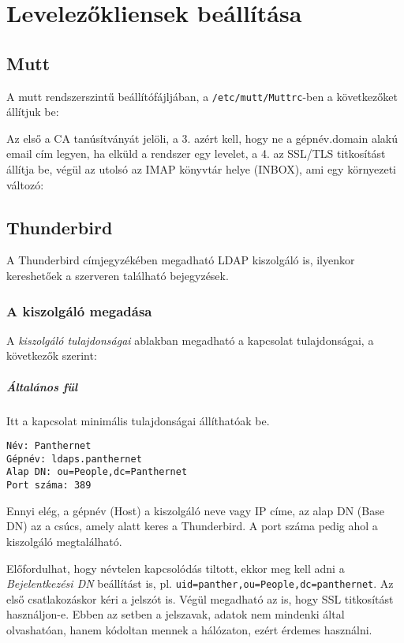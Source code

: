 \chapter{Levelezőkliensek beállítása}
\section{Mutt}
A mutt rendszerszintű beállítófájljában, a \texttt{/etc/mutt/Muttrc}-ben a következőket állítjuk be:


Az első a CA tanúsítványát jelöli, a 3. azért kell, hogy ne a gépnév.domain alakú email cím legyen, ha elküld a
rendszer egy levelet, a 4. az SSL/TLS titkosítást állítja be, végül az utolsó az IMAP könyvtár helye (INBOX), ami egy
környezeti változó:


\section{Thunderbird}
A Thunderbird címjegyzékében megadható LDAP kiszolgáló is, ilyenkor kereshetőek a szerveren található bejegyzések.

\subsection{A kiszolgáló megadása}
A \emph{kiszolgáló tulajdonságai} ablakban megadható a kapcsolat tulajdonságai, a következők szerint:

\paragraph{Általános fül} Itt a kapcsolat minimális tulajdonságai állíthatóak be.
\begin{Verbatim}
Név: Panthernet
Gépnév: ldaps.panthernet
Alap DN: ou=People,dc=Panthernet
Port száma: 389
\end{Verbatim}

Ennyi elég, a gépnév (Host) a kiszolgáló neve vagy IP címe, az alap DN (Base DN) az a csúcs, amely alatt keres a
Thunderbird. A port száma pedig ahol a kiszolgáló megtalálható.

Előfordulhat, hogy névtelen kapcsolódás tiltott, ekkor meg kell adni a \emph{Bejelentkezési DN} beállítást is,
pl. \texttt{uid=panther,ou=People,dc=panthernet}. Az első csatlakozáskor kéri a jelszót is. Végül megadható az is, hogy
SSL titkosítást használjon-e. Ebben az setben a jelszavak, adatok nem mindenki által olvashatóan, hanem kódoltan mennek a hálózaton, ezért érdemes használni.

